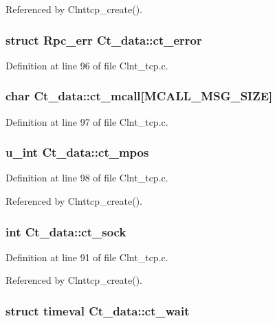 Referenced by Clnttcp\_\-create().
\subsubsection{\setlength{\rightskip}{0pt plus 5cm}struct Rpc\_\-err {\bf Ct\_\-data::ct\_\-error}}\label{structCt__data_o5}




Definition at line 96 of file Clnt\_\-tcp.c.
\subsubsection{\setlength{\rightskip}{0pt plus 5cm}char {\bf Ct\_\-data::ct\_\-mcall}[MCALL\_\-MSG\_\-SIZE]}\label{structCt__data_o6}




Definition at line 97 of file Clnt\_\-tcp.c.
\subsubsection{\setlength{\rightskip}{0pt plus 5cm}u\_\-int {\bf Ct\_\-data::ct\_\-mpos}}\label{structCt__data_o7}




Definition at line 98 of file Clnt\_\-tcp.c.

Referenced by Clnttcp\_\-create().
\subsubsection{\setlength{\rightskip}{0pt plus 5cm}int {\bf Ct\_\-data::ct\_\-sock}}\label{structCt__data_o0}




Definition at line 91 of file Clnt\_\-tcp.c.

Referenced by Clnttcp\_\-create().
\subsubsection{\setlength{\rightskip}{0pt plus 5cm}struct timeval {\bf Ct\_\-data::ct\_\-wait}}\label{structCt__data_o2}




